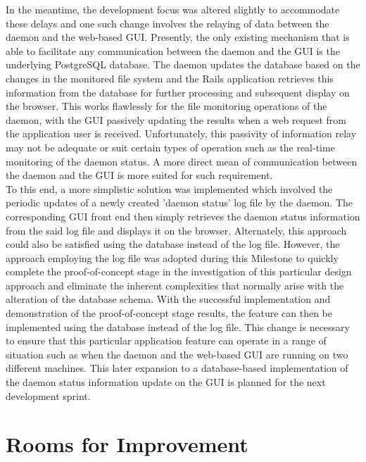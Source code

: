 \documentclass{article}
\begin{document}
In the meantime, the development focus was altered slightly to accommodate these delays and one such change involves the relaying of data between the daemon and the web-based GUI. Presently, the only existing mechanism that is able to facilitate any communication between the daemon and the GUI is the underlying PostgreSQL database. The daemon updates the database based on the changes in the monitored file system and the Rails application retrieves this information from the database for further processing and subsequent display on the browser. This works flawlessly for the file monitoring operations of the daemon, with the GUI passively updating the results when a web request from the application user is received. Unfortunately, this passivity of information relay may not be adequate or suit certain types of operation such as the real-time monitoring of the daemon status. A more direct mean of communication between the daemon and the GUI is more suited for such requirement. \\

To this end, a more simplistic solution was implemented which involved the periodic updates of a newly created 'daemon status' log file by the daemon. The corresponding GUI front end then simply retrieves the daemon status information from the said log file and displays it on the browser. Alternately, this approach could also be satisfied using the database instead of the log file. However, the approach employing the log file was adopted during this Milestone to quickly complete the proof-of-concept stage in the investigation of this particular design approach and eliminate the inherent complexities that normally arise with the alteration of the database schema. With the successful implementation and demonstration of the proof-of-concept stage results, the feature can then be implemented using the database instead of the log file. This change is necessary to ensure that this particular application feature can operate in a range of situation such as when the daemon and the web-based GUI are running on two different machines. This later expansion to a database-based implementation of the daemon status information update on the GUI is planned for the next development sprint.


\section*{Rooms for Improvement}
\end{document}
